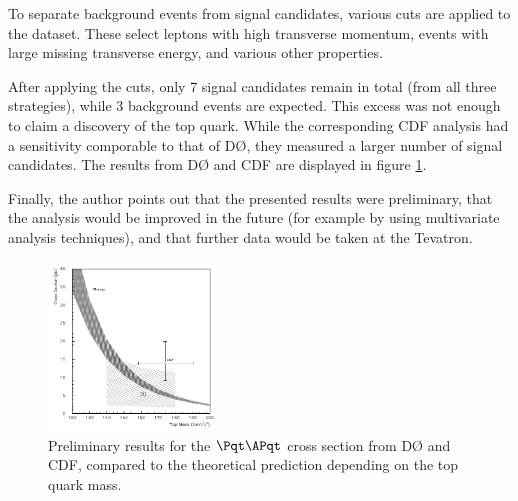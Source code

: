 To separate background events from signal candidates, various cuts are applied to the dataset.
These select leptons with high transverse momentum, events with large missing transverse energy, and various other properties.

After applying the cuts, only 7 signal candidates remain in total (from all three strategies), while 3 background events are expected.
This excess was not enough to claim a discovery of the top quark.
While the corresponding CDF analysis had a sensitivity comporable to that of DØ, they measured a larger number of signal candidates\cite{cdf}.
The results from DØ and CDF are displayed in figure \ref{results}.

Finally, the author points out that the presented results were preliminary, that the analysis would be improved in the future (for example by using multivariate analysis techniques), and that further data would be taken at the Tevatron.

\begin{figure}
  \centering
  \includegraphics[width=0.4\textwidth]{figures/result.pdf}
  \caption{
    Preliminary results for the $\Pqt\APqt$ cross section from DØ and CDF, compared to the theoretical prediction depending on the top quark mass.
  }
  \label{results}
\end{figure}
